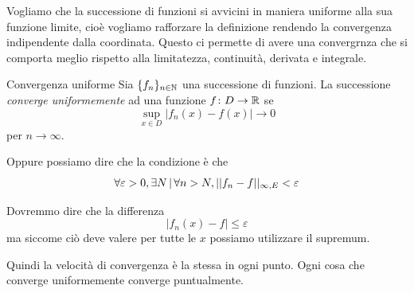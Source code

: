 \documentclass[a4paper]{article}
\begin{document}
\begin{radioactive}
Vogliamo che la successione di funzioni si avvicini in maniera uniforme
alla sua funzione limite, cioè vogliamo rafforzare la definizione
rendendo la convergenza indipendente dalla coordinata.
Questo ci permette di avere una convergrnza che si comporta meglio rispetto alla limitatezza,
continuità, derivata e integrale.
\end{radioactive}

\begin{radioactive}
\begin{snippetdefinition}{Convergenza uniforme}
    Sia \(\{f_n\}_{n\in\mathbb{N}}\) una successione di funzioni.
    La successione \emph{converge uniformemente} ad una funzione \(f\colon D \to \mathbb{R}\) se
    \[
        \sup_{x\in D} \left| f_n(x) - f(x) \right| \to 0
    \]
    per \(n\to\infty\).
\end{snippetdefinition}
\end{radioactive}

\begin{radioactive}
Oppure possiamo dire che la condizione è che
\[
    \forall \varepsilon > 0, \exists N \,|\, \forall n>N, ||f_n-f||_{\infty, E} < \varepsilon
\]

Dovremmo dire che la differenza
\[
    |f_n(x) - f| \leq \varepsilon
\]
ma siccome ciò deve valere per tutte le \(x\) possiamo utilizzare il supremum.

Quindi la velocità di convergenza è la stessa in ogni punto. 
Ogni cosa che converge uniformemente converge puntualmente.
\end{radioactive}
\end{document}
